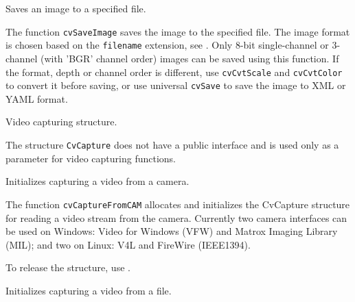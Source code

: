 Saves an image to a specified file.


\begin{description}
\end{description}

The function \texttt{cvSaveImage} saves the image to the specified file. The image format is chosen based on the \texttt{filename} extension, see . Only 8-bit single-channel or 3-channel (with 'BGR' channel order) images can be saved using this function. If the format, depth or channel order is different, use \texttt{cvCvtScale} and \texttt{cvCvtColor} to convert it before saving, or use universal \texttt{cvSave} to save the image to XML or YAML format.


\label{CvCapture}
Video capturing structure.


The structure \texttt{CvCapture} does not have a public interface and is used only as a parameter for video capturing functions.

Initializes capturing a video from a camera.


\begin{description}
\end{description}

The function \texttt{cvCaptureFromCAM} allocates and initializes the CvCapture structure for reading a video stream from the camera. Currently two camera interfaces can be used on Windows: Video for Windows (VFW) and Matrox Imaging Library (MIL); and two on Linux: V4L and FireWire (IEEE1394).

To release the structure, use .


Initializes capturing a video from a file.


